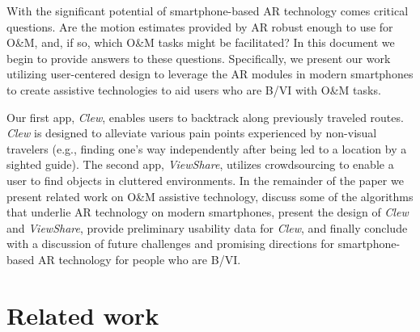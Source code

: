 \documentclass[chi_draft]{sigchi}
\newcommand{\BVI}{B/VI\xspace}
\newcommand{\OM}{O\&M\xspace}
\begin{document}
With the significant potential of smartphone-based AR technology comes critical questions.  Are the motion estimates provided by AR robust enough to use for \OM, and, if so, which \OM tasks might be facilitated?  In this document we begin to provide answers to these questions.  Specifically, we present our work utilizing user-centered design to leverage the AR modules in modern smartphones to create assistive technologies to aid users who are \BVI with \OM tasks.%

Our first app, \emph{Clew}, enables users to backtrack along previously traveled routes.  \emph{Clew} is designed to alleviate various pain points experienced by non-visual travelers (e.g., finding one's way independently after being led to a location by a sighted guide).  The second app, \emph{ViewShare}, utilizes crowdsourcing to enable a user to find objects in cluttered environments.  In the remainder of the paper we present related work on \OM assistive technology, discuss some of the algorithms that underlie AR technology on modern smartphones, present the design of \emph{Clew} and \emph{ViewShare}, provide preliminary usability data for \emph{Clew}, and finally conclude with a discussion of future challenges and promising directions for smartphone-based AR technology for people who are \BVI.

\section{Related work}
\end{document}
